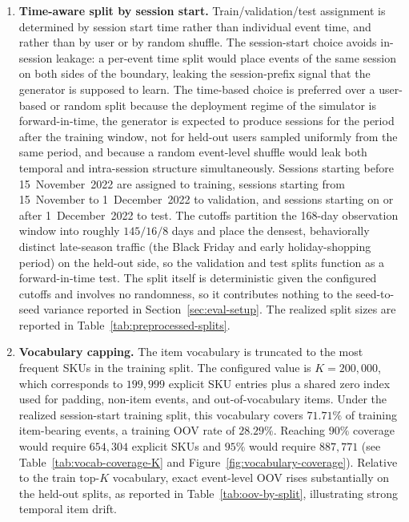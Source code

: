 \documentclass[sigconf,nonacm]{acmart}
\begin{document}
\begin{enumerate}
    \item \textbf{Time-aware split by session start.}
    Train/validation/test assignment is determined by session start time
    rather than individual event time, and rather than by user or by
    random shuffle. The session-start choice avoids in-session leakage:
    a per-event time split would place events of the same session on
    both sides of the boundary, leaking the session-prefix signal that
    the generator is supposed to learn. The time-based choice is
    preferred over a user-based or random split because the deployment
    regime of the simulator is forward-in-time, the generator is
    expected to produce sessions for the period after the training
    window, not for held-out users sampled uniformly from the same
    period, and because a random event-level shuffle would leak both
    temporal and intra-session structure simultaneously. Sessions
    starting before 15~November~2022 are assigned to training, sessions
    starting from 15~November to 1~December~2022 to validation, and
    sessions starting on or after 1~December~2022 to test. The cutoffs
    partition the 168-day observation window into roughly $145/16/8$
    days and place the densest, behaviorally distinct
    late-season traffic (the Black Friday and early holiday-shopping
    period) on the held-out side, so the validation and test splits
    function as a forward-in-time test. The split itself is deterministic given
    the configured cutoffs and involves no randomness, so it
    contributes nothing to the seed-to-seed variance reported in
    Section~\ref{sec:eval-setup}. The realized split sizes are reported
    in Table~\ref{tab:preprocessed-splits}.

    \item \textbf{Vocabulary capping.}
    The item vocabulary is truncated to the most frequent SKUs in the training
    split. The configured value is $K = 200{,}000$, which corresponds to
    $199{,}999$ explicit SKU entries plus a shared zero index used for padding,
    non-item events, and out-of-vocabulary items. Under the realized
    session-start training split, this vocabulary covers $71.71\%$ of training
    item-bearing events, a training OOV rate of $28.29\%$. Reaching
    $90\%$ coverage would require $654{,}304$ explicit SKUs and $95\%$ would
    require $887{,}771$ (see Table~\ref{tab:vocab-coverage-K} and
    Figure~\ref{fig:vocabulary-coverage}).
    Relative to
    the train top-$K$ vocabulary, exact event-level OOV rises substantially on
    the held-out splits, as reported in Table~\ref{tab:oov-by-split},
    illustrating strong temporal item drift.


\end{enumerate}
\end{document}
